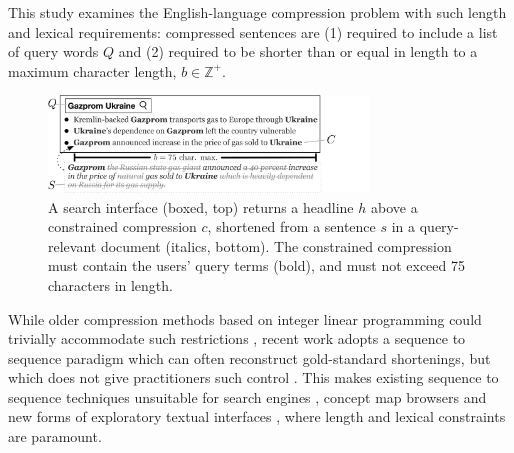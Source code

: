 \documentclass[11pt,a4paper]{article}
\begin{document}
This study examines the English-language compression problem with such length and lexical requirements: compressed sentences are (1) required to include a list of query words $Q$ and (2) required to be shorter than or equal in length to a maximum character length, $b \in \mathbb{Z}^{+}$. 

\begin{figure}[htb!]
\includegraphics[width=8.5cm]{qf.pdf}
\caption{A search interface (boxed, top) returns a headline $h$ above a constrained compression $c$, shortened from a sentence $s$ in a query-relevant document (italics, bottom). The constrained compression must contain the users' query terms (bold), and must not exceed 75 characters in length.}
\label{f:qf}
\end{figure}


While older compression methods based on integer linear programming could trivially accommodate such restrictions \cite{clarke2008global,filippova2013overcoming}, recent work adopts a sequence to sequence paradigm which can often reconstruct gold-standard shortenings, but which does not give practitioners such control \cite{filippova2015sentence}. This makes existing sequence to sequence techniques unsuitable for search engines \cite{hearst2009search}, concept map browsers \cite{falke2017graphdocexplore} and new forms of exploratory textual interfaces \cite{marchionini2006exploratory}, where length and lexical constraints are paramount. 
\end{document}
